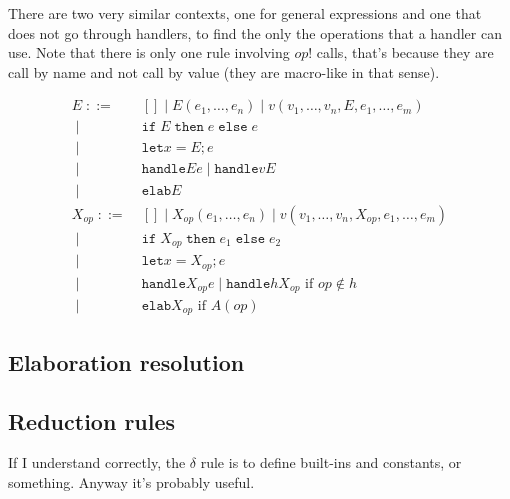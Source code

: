 \documentclass{article}
\newcommand\kw[1]{\ensuremath{\mathbf{\mathtt{#1}}}}
\newcommand\IS{\mathbin{\;::=\;}}
\newcommand\OR{\mathbin{\;|\;}}
\newcommand\handle{\kw{handle}}
\newcommand\elab{\kw{elab}}
\newcommand\cond[3]{\kw{if}\;#1\;\kw{then}\;#2\;\kw{else}\;#3}
\begin{document}
There are two very similar contexts, one for general expressions and one that does not go through handlers, to find the only the operations that a handler can use. Note that there is only one rule involving $op!$ calls, that's because they are call by name and not call by value (they are macro-like in that sense).

\begin{align*}
    E
        \IS & [] \OR E(e_1,\dots, e_n) \OR v(v_1,\dots,v_n,E,e_1,\dots,e_m) \\
        \OR & \cond{E}{e}{e} \\
        \OR & \kw{let} x = E; e \\
        \OR & \handle E e \OR \handle v E \\
        \OR & \elab E \\
    X_{op}
        \IS & [] \OR X_{op}(e_1, \dots, e_n) \OR v(v_1, \dots, v_n, X_{op}, e_1, \dots, e_m) \\
        \OR & \cond{X_{op}}{e_1}{e_2} \\
        \OR & \kw{let} x = X_{op}; e \\
        \OR & \handle{X_{op}}{e} \OR \handle{h}{X_{op}} \text{ if } op\not\in h \\
        \OR & \elab X_{op} \text{ if } A(op)
\end{align*}

\subsection{Elaboration resolution}

\subsection{Reduction rules}

If I understand correctly, the $\delta$ rule is to define built-ins and constants, or something. Anyway it's probably useful.
\end{document}
